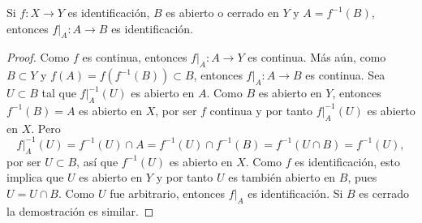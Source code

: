 
\begin{theorem}
Si $f : X \longrightarrow Y$ es identificación, $B$ es abierto o cerrado en $Y$ y $A = f^{-1}(B)$, entonces $f|_{A} : A \longrightarrow B$ es identificación.
\end{theorem}

\begin{proof}
Como $f$ es continua, entonces $f|_A : A \longrightarrow Y$ es continua. Más aún, como $B \subset Y$ y $f(A) = f(f^{-1}(B)) \subset B$, entonces $f|_A : A \longrightarrow B$ es continua. Sea $U \subset B$ tal que $f|_A^{-1}(U)$ es abierto en $A$. Como $B$ es abierto en $Y$, entonces $f^{-1}(B) = A$ es abierto en $X$, por ser $f$ continua y por tanto $f|_A^{-1}(U)$ es abierto en $X$. Pero
\begin{equation*}
    f|_A^{-1}(U) = f^{-1}(U) \cap A = f^{-1}(U) \cap f^{-1}(B) = f^{-1}(U \cap B) = f^{-1}(U),
\end{equation*}
por ser $U \subset B$, así que $f^{-1}(U)$ es abierto en $X$. Como $f$ es identificación, esto implica que $U$ es abierto en $Y$ y por tanto $U$ es también abierto en $B$, pues $U = U \cap B$. Como $U$ fue arbitrario, entonces $f|_A$ es identificación. Si $B$ es cerrado la demostración es similar.
\end{proof}
